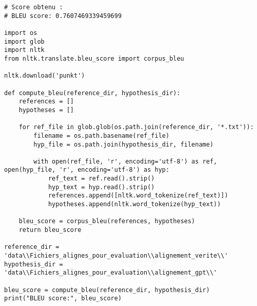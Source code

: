 \begin{verbatim}
# Score obtenu : 
# BLEU score: 0.7607469339459699

import os
import glob
import nltk
from nltk.translate.bleu_score import corpus_bleu

nltk.download('punkt')

def compute_bleu(reference_dir, hypothesis_dir):
    references = []
    hypotheses = []

    for ref_file in glob.glob(os.path.join(reference_dir, '*.txt')):
        filename = os.path.basename(ref_file)
        hyp_file = os.path.join(hypothesis_dir, filename)

        with open(ref_file, 'r', encoding='utf-8') as ref, open(hyp_file, 'r', encoding='utf-8') as hyp:
            ref_text = ref.read().strip()
            hyp_text = hyp.read().strip()
            references.append([nltk.word_tokenize(ref_text)])
            hypotheses.append(nltk.word_tokenize(hyp_text))
    
    bleu_score = corpus_bleu(references, hypotheses)
    return bleu_score

reference_dir = 'data\\Fichiers_alignes_pour_evaluation\\alignement_verite\\'
hypothesis_dir = 'data\\Fichiers_alignes_pour_evaluation\\alignement_gpt\\'

bleu_score = compute_bleu(reference_dir, hypothesis_dir)
print("BLEU score:", bleu_score)
\end{verbatim}